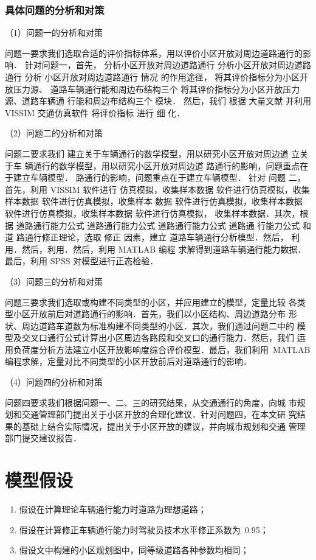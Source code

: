 \subsubsection{具体问题的分析和对策}

（1）问题一的分析和对策

问题一要求我们选取合适的评价指标体系，用以评价小区开放对周边道路通行的影响．
针对问题一，首先， 分析小区开放对周边道路通行 分析小区开放对周边道路通行 分析
小区开放对周边道路通行 情况 的作用途径， 将其评价指标分为小区开放压力源、
道路车辆通行能和周边布结构三个 将其评价指标分为小区开放压力源、道路车辆通
行能和周边布结构三个 模块． 然后，我们 根据 大量文献 并利用 VISSIM 交通仿真软件
 将评价指标 进行 细 化．

（2）问题二的分析和对策

问题二要求我们 建立关于车辆通行的数学模型，用以研究小区开放对周边道 立关于车
辆通行的数学模型，用以研究小区开放对周边道 路通行的影响，问题重点在于建立车辆模型．
 路通行的影响，问题重点在于建立车辆模型． 针对 问题 二，首先，利用 VISSIM 软件进行
 仿真模拟，收集样本数据 软件进行仿真模拟，收集样本数据 软件进行仿真模拟，收集样本
 数据 软件进行仿真模拟，收集样本数据 软件进行仿真模拟，收集样本数据 软件进行仿真模拟，
 收集样本数据．其次，根据 道路通行能力公式 道路通行能力公式 道路通行能力公式 道路通
 行能力公式 和道 路通行修正理论，选取 修正 因素，建立 道路车辆通行分析模型．然后，
 利用．然后，利用．然后，利用 MATLAB
编程\cite{2} 求解得到道路车辆通行能力数据．最后，利用 SPSS 对模型进行正态检验．

（3）问题三的分析和对策

问题三要求我们选取或构建不同类型的小区，并应用建立的模型，定量比较
各类型小区开放前后对道路通行的影响．首先，我们以小区结构、周边道路分布
形状、周边道路车道数为标准构建不同类型的小区．其次，我们通过问题二中的
模型及交叉口通行公式计算出小区周边各路段和交叉口的通行能力．然后，我们
运用负荷度分析方法建立小区开放影响度综合评价模型．最后，我们利用~MATLAB
编程求解，定量对比不同类型的小区开放前后对道路通行的影响．

（4）问题四的分析和对策

问题四要求我们根据问题一、二、三的研究结果，从交通通行的角度，向城
市规划和交通管理部门提出关于小区开放的合理化建议．针对问题四，在本文研
究结果的基础上结合实际情况，提出关于小区开放的建议，并向城市规划和交通
管理部门提交建议报告．

\section{模型假设}
\begin{enumerate}
  \item 假设在计算理论车辆通行能力时道路为理想道路；
  \item 假设在计算修正车辆通行能力时驾驶员技术水平修正系数为~0.95；
  \item 假设文中构建的小区规划图中，同等级道路各种参数均相同；
\end{enumerate}

